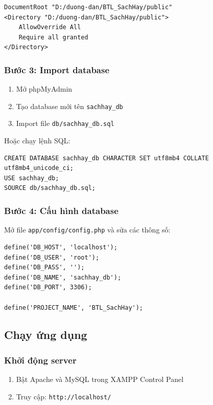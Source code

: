 \begin{verbatim}
DocumentRoot "D:/duong-dan/BTL_SachHay/public"
<Directory "D:/duong-dan/BTL_SachHay/public">
    AllowOverride All
    Require all granted
</Directory>
\end{verbatim}

\subsubsection{Bước 3: Import database}

\begin{enumerate}
    \item Mở phpMyAdmin
    \item Tạo database mới tên \texttt{sachhay\_db}
    \item Import file \texttt{db/sachhay\_db.sql}
\end{enumerate}

Hoặc chạy lệnh SQL:
\begin{verbatim}
CREATE DATABASE sachhay_db CHARACTER SET utf8mb4 COLLATE utf8mb4_unicode_ci;
USE sachhay_db;
SOURCE db/sachhay_db.sql;
\end{verbatim}

\subsubsection{Bước 4: Cấu hình database}

Mở file \texttt{app/config/config.php} và sửa các thông số:

\begin{lstlisting}[style=phpstyle, caption=File cấu hình config.php]
define('DB_HOST', 'localhost');
define('DB_USER', 'root');           
define('DB_PASS', '');               
define('DB_NAME', 'sachhay_db');    
define('DB_PORT', 3306);            

define('PROJECT_NAME', 'BTL_SachHay'); 
\end{lstlisting}

\subsection{Chạy ứng dụng}

\subsubsection{Khởi động server}
\begin{enumerate}
    \item Bật Apache và MySQL trong XAMPP Control Panel
    \item Truy cập: \texttt{http://localhost/}
\end{enumerate}

